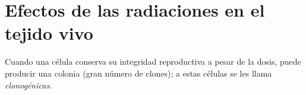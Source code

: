 \documentclass[12pt,letterpaper, oneside]{book}
\begin{document}
			
			
			
			
			
			
						
		\section{Efectos de las radiaciones en el tejido vivo}
		Cuando una célula conserva su integridad reproductiva a pesar de la dosis, puede producir una colonia (gran número de clones); a estas células se les llama \textit{clonogénicas}\cite{Hall.2000}.
		
\end{document}
